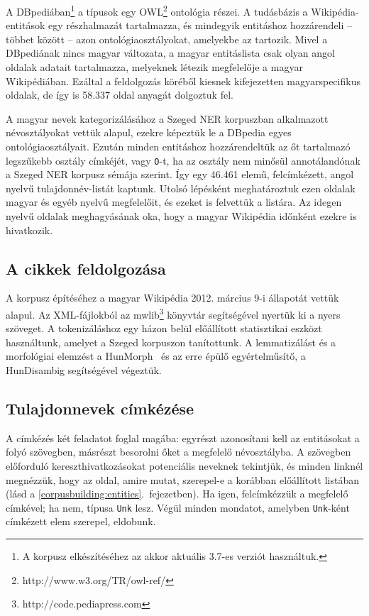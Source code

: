 \documentclass{llncs}
\begin{document}
A DBpediában\footnote{A korpusz elkészítéséhez az akkor aktuális 3.7-es verziót
használtuk.} a típusok egy OWL\footnote{http://www.w3.org/TR/owl-ref/}
ontológia részei. A tudásbázis a Wiki\-pé\-dia-entitások egy részhalmazát
tartalmazza, és mindegyik entitáshoz hozzárendeli -- többet között -- azon
ontológiaosztályokat, amelyekbe az tartozik. Mivel a DBpediának nincs magyar változata, 
a magyar entitáslista csak olyan angol oldalak adatait
tartalmazza, melyeknek létezik megfelelője a magyar Wikipédiában. 
Ezáltal a feldolgozás köréből kiesnek kifejezetten magyarspecifikus oldalak, de 
így is 58.337 oldal anyagát dolgoztuk fel. 

A magyar nevek kategorizálásához a Szeged NER \cite{Szarvas:06} korpuszban alkalmazott névosztályokat vettük alapul, ezekre képeztük le a DBpedia egyes ontológiaosztályait. 
Ezután minden entitáshoz hozzárendeltük az őt tartalmazó
legszűkebb osztály címkéjét, vagy \texttt{O}-t, ha az osztály nem minősül
annotálandónak a Szeged NER korpusz sémája szerint. Így egy 46.461 elemű,
felcímkézett, angol nyelvű tulajdonnév-listát kaptunk. Utolsó lépésként
meghatároztuk ezen oldalak magyar és egyéb nyelvű megfelelőit, és ezeket
is felvettük a listára. Az idegen nyelvű oldalak meghagyásának oka, hogy
a magyar Wikipédia időnként ezekre is hivatkozik.

\subsection{A cikkek feldolgozása}

A korpusz építéséhez a magyar Wikipédia 2012. március 9-i állapotát vettük
alapul. Az XML-fájlokból az mwlib\footnote{http://code.pediapress.com}
könyvtár segítségével nyertük ki a nyers szöveget. 
A tokenizáláshoz egy házon belül előállított statisztikai eszközt használtunk, amelyet a Szeged korpuszon \cite{csendes} tanítottunk. 
A lemmatizálást és a morfológiai elemzést a
HunMorph~\cite{Tron:05} és az erre épülő egyértelműsítő, a HunDisambig
segítségével végeztük. %

\subsection{Tulajdonnevek címkézése}

A címkézés két feladatot foglal magába: egyrészt azonosítani kell az
entitásokat a folyó szövegben, másrészt besorolni őket a megfelelő
névosztályba. 
A szövegben előforduló kereszthivatkozásokat potenciális neveknek tekintjük, és minden
linknél megnézzük, hogy az oldal, amire mutat, szerepel-e a
korábban előállított listában (lásd a \ref{corpusbuilding:entities}.~fejezetben). Ha igen,
felcímkézzük a megfelelő címkével; ha nem, típusa \texttt{Unk} lesz. Végül
minden mondatot, amelyben \texttt{Unk}-ként címkézett elem szerepel, eldobunk.
\end{document}
